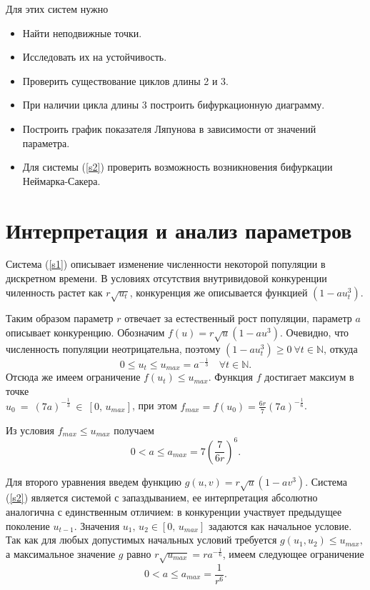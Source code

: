 \documentclass[16pt]{article}
\begin{document}
Для этих систем нужно
\begin{itemize}
\item
Найти неподвижные точки.
\item
Исследовать их на устойчивость.
\item
Проверить существование циклов длины 2 и 3.
\item
При наличии цикла длины 3 построить бифуркационную диаграмму.
\item
Построить график показателя Ляпунова в зависимости от значений параметра.
\item Для системы (\ref{s2}) проверить возможность возникновения бифуркации Неймарка-Сакера.
\end{itemize}

\section{Интерпретация и анализ параметров}
Система (\ref{s1}) описывает изменение численности некоторой популяции в дискретном времени. В условиях отсутствия
внутривидовой конкуренции чиленность растет как $r\sqrt{u_t}$, конкуренция же описывается функцией $(1-au_t^3)$.
 
Таким образом параметр $r$ отвечает за естественный рост популяции, параметр $a$ описывает конкуренцию.
Обозначим $f(u) = r\sqrt{u}(1-au^3)$.
Очевидно, что численность популяции неотрицательна, поэтому $(1-au_t^3) \geqslant 0 \ \forall t \in \mathbb{N}$, откуда 
$$0 \leqslant u_t \leqslant u_{max} = a^{-\frac{1}{3}} \quad \forall t \in \mathbb{N}.$$ Отсюда же имеем ограничение 
$f(u_t) \leqslant u_{max}$.
Функция $f$ достигает максиум в точке \\$u_0~=~(7a)^{-\frac13}~\in~[0,\,u_{max}]$, при этом 
$f_{max} = f(u_0) = \frac{6r}{7}(7a)^{-\frac16}$.

Из условия $f_{max} \leqslant u_{max}$ получаем $$0 < a \leqslant a_{max} = 7\left(\dfrac{7}{6r}\right)^6.$$

Для второго уравнения введем функцию $g(u, v) = r\sqrt{u}(1-av^3)$.
Система (\ref{s2}) является системой с запаздыванием, ее интерпретация абсолютно аналогична с единственным отличием:
в конкуренции участвует предыдущее поколение $u_{t-1}$. Значения $u_1,\, u_2 \in [0,\, u_{max}]$  задаются
как начальное условие. Так как для любых допустимых начальных условий требуется $g(u_1, u_2) \leqslant u_{max},$ а максимальное
значение $g$ равно $r\sqrt{u_{max}} = ra^{-\frac16}$, имеем следующее ограничение
$$0 < a \leqslant a_{max} = \frac{1}{r^6}.$$
\end{document}
